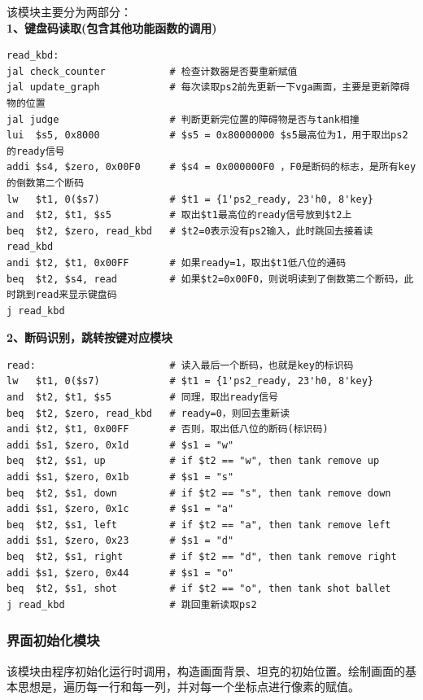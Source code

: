 该模块主要分为两部分：\\

\textbf{1、键盘码读取(包含其他功能函数的调用)}
\begin{lstlisting}[frame=shadowbox]
read_kbd:
jal check_counter           # 检查计数器是否要重新赋值
jal update_graph            # 每次读取ps2前先更新一下vga画面，主要是更新障碍物的位置
jal judge                   # 判断更新完位置的障碍物是否与tank相撞
lui  $s5, 0x8000            # $s5 = 0x80000000 $s5最高位为1，用于取出ps2的ready信号
addi $s4, $zero, 0x00F0     # $s4 = 0x000000F0 ，F0是断码的标志，是所有key的倒数第二个断码
lw   $t1, 0($s7)            # $t1 = {1'ps2_ready, 23'h0, 8'key}
and  $t2, $t1, $s5          # 取出$t1最高位的ready信号放到$t2上
beq  $t2, $zero, read_kbd   # $t2=0表示没有ps2输入，此时跳回去接着读read_kbd
andi $t2, $t1, 0x00FF       # 如果ready=1，取出$t1低八位的通码
beq  $t2, $s4, read         # 如果$t2=0x00F0，则说明读到了倒数第二个断码，此时跳到read来显示键盘码
j read_kbd  
\end{lstlisting}
 
\textbf{2、断码识别，跳转按键对应模块}
\begin{lstlisting}[frame=shadowbox]
read:                       # 读入最后一个断码，也就是key的标识码
lw   $t1, 0($s7)            # $t1 = {1'ps2_ready, 23'h0, 8'key}
and  $t2, $t1, $s5          # 同理，取出ready信号
beq  $t2, $zero, read_kbd   # ready=0，则回去重新读
andi $t2, $t1, 0x00FF       # 否则，取出低八位的断码(标识码)
addi $s1, $zero, 0x1d       # $s1 = "w"
beq  $t2, $s1, up           # if $t2 == "w", then tank remove up
addi $s1, $zero, 0x1b       # $s1 = "s"
beq  $t2, $s1, down         # if $t2 == "s", then tank remove down
addi $s1, $zero, 0x1c       # $s1 = "a"
beq  $t2, $s1, left         # if $t2 == "a", then tank remove left
addi $s1, $zero, 0x23       # $s1 = "d"
beq  $t2, $s1, right        # if $t2 == "d", then tank remove right
addi $s1, $zero, 0x44       # $s1 = "o"
beq  $t2, $s1, shot         # if $t2 == "o", then tank shot ballet
j read_kbd                  # 跳回重新读取ps2
\end{lstlisting}

\subsubsection{界面初始化模块}
该模块由程序初始化运行时调用，构造画面背景、坦克的初始位置。绘制画面的基本思想是，遍历每一行和每一列，并对每一个坐标点进行像素的赋值。\\

